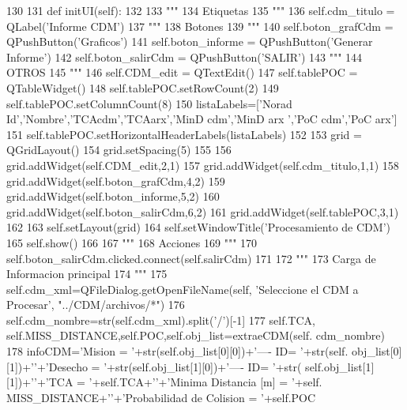 \begin{DoxyCode}
130 
131     def initUI(self):
132         
133         """
134         Etiquetas
135         """
136         self.cdm_titulo = QLabel('Informe CDM')      
137         """
138         Botones
139         """
140         self.boton_grafCdm  = QPushButton('Graficos')
141         self.boton_informe  = QPushButton('Generar Informe')
142         self.boton_salirCdm = QPushButton('SALIR')
143         """
144         OTROS
145         """
146         self.CDM_edit    = QTextEdit()
147         self.tablePOC   = QTableWidget()
148         self.tablePOC.setRowCount(2)
149         self.tablePOC.setColumnCount(8)
150         listaLabels=['Norad Id','Nombre','TCAcdm','TCAarx','MinD cdm','MinD arx
      ','PoC cdm','PoC arx']
151         self.tablePOC.setHorizontalHeaderLabels(listaLabels)
152         
153         grid = QGridLayout()
154         grid.setSpacing(5)
155         
156         grid.addWidget(self.CDM_edit,2,1)
157         grid.addWidget(self.cdm_titulo,1,1)
158         grid.addWidget(self.boton_grafCdm,4,2)
159         grid.addWidget(self.boton_informe,5,2)
160         grid.addWidget(self.boton_salirCdm,6,2)
161         grid.addWidget(self.tablePOC,3,1)
162         
163         self.setLayout(grid)
164         self.setWindowTitle('Procesamiento de CDM')    
165         self.show()
166         
167         """
168         Acciones
169         """
170         self.boton_salirCdm.clicked.connect(self.salirCdm)
171         
172         """
173         Carga de Informacion principal
174         """
175         self.cdm_xml=QFileDialog.getOpenFileName(self, 'Seleccione el CDM a
       Procesar', "../CDM/archivos/*")
176         self.cdm_nombre=str(self.cdm_xml).split('/')[-1]
177         self.TCA, self.MISS_DISTANCE,self.POC,self.obj_list=extraeCDM(self.
      cdm_nombre)
178         infoCDM='Mision = '+str(self.obj_list[0][0])+'---- ID= '+str(self.
      obj_list[0][1])+'\n'+'Desecho = '+str(self.obj_list[1][0])+'---- ID= '+str(
      self.obj_list[1][1])+'\n'+'TCA = '+self.TCA+'\n'+'Minima Distancia [m] = '+self.
      MISS_DISTANCE+'\n'+'Probabilidad de Colision = '+self.POC                           
                                     

\end{DoxyCode}
